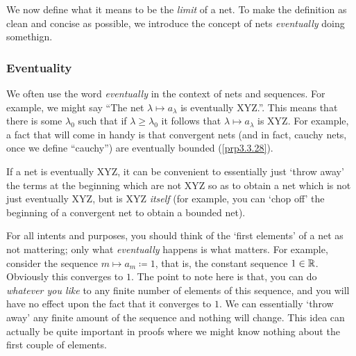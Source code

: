 We now define what it means to be the \emph{limit} of a net.  To make the definition as clean and concise as possible, we introduce the concept of nets \emph{eventually} doing somethign.

\subsubsection{Eventuality}

We often use the word \emph{eventually} in the context of nets and sequences.  For example, we might say ``The net $\lambda \mapsto a_\lambda$ is eventually XYZ.''.  This means that there is some $\lambda _0$ such that if $\lambda \geq \lambda _0$ it follows that $\lambda \mapsto a_\lambda$ is XYZ.  For example, a fact that will come in handy is that convergent nets (and in fact, cauchy nets, once we define ``cauchy'') are eventually bounded (\cref{prp3.3.28}).

If a net is eventually XYZ, it can be convenient to essentially just `throw away' the terms at the beginning which are not XYZ so as to obtain a net which is not just eventually XYZ, but is XYZ \emph{itself} (for example, you can `chop off' the beginning of a convergent net to obtain a bounded net).

For all intents and purposes, you should think of the `first elements' of a net as not mattering; only what \emph{eventually} happens is what matters.  For example, consider the sequence $m\mapsto a_m\coloneqq 1$, that is, the constant sequence $1\in \mathbb{R}$.  Obviously this converges to $1$.  The point to note here is that, you can do \emph{whatever you like} to any finite number of elements of this sequence, and you will have no effect upon the fact that it converges to $1$.  We can essentially `throw away' any finite amount of the sequence and nothing will change.  This idea can actually be quite important in proofs where we might know nothing about the first couple of elements.

\horizontalrule

